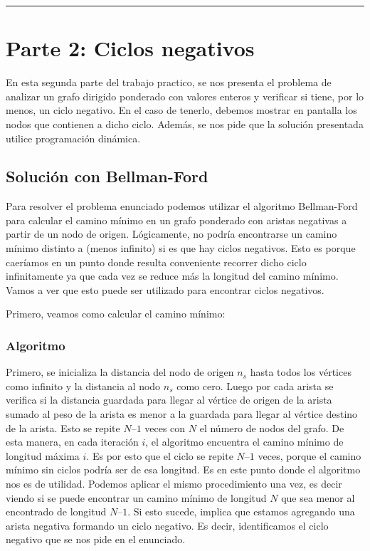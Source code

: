\documentclass[titlepage,a4paper]{article}
\begin{document}
\noindent\rule{\textwidth}{0.5pt}

\newpage

\section{Parte 2: Ciclos negativos}
\label{sec:org1a03caa}

En esta segunda parte del trabajo practico, se nos presenta el problema de
analizar un grafo dirigido ponderado con valores enteros y verificar si tiene,
por lo menos, un ciclo negativo. En el caso de tenerlo, debemos mostrar en
pantalla los nodos que contienen a dicho ciclo. Además, se nos pide que la
solución presentada utilice programación dinámica.

\subsection{Solución con Bellman-Ford}
\label{sec:org5f72b3a}
Para resolver el problema enunciado podemos utilizar el algoritmo Bellman-Ford
para calcular el camino mínimo en un grafo ponderado con aristas negativas a
partir de un nodo de origen. Lógicamente, no podría encontrarse un camino mínimo
distinto a (menos infinito) si es que hay ciclos negativos. Esto es porque
caeríamos en un punto donde resulta conveniente recorrer dicho ciclo
infinitamente ya que cada vez se reduce más la longitud del camino mínimo. Vamos
a ver que esto puede ser utilizado para encontrar ciclos negativos.


\hfill

Primero, veamos como calcular el camino mínimo:

\subsubsection{Algoritmo}
\label{sec:org2ca4ac7}

Primero, se inicializa la distancia del nodo de origen \(n_s\) hasta todos los
vértices como infinito y la distancia al nodo \(n_s\) como cero. Luego por cada
arista se verifica si la distancia guardada para llegar al vértice de origen de
la arista sumado al peso de la arista es menor a la guardada para llegar al
vértice destino de la arista. Esto se repite \(N – 1\) veces con \(N\) el número de
nodos del grafo. De esta manera, en cada iteración \(i\), el algoritmo encuentra el
camino mínimo de longitud máxima \(i\). Es por esto que el ciclo se repite \(N – 1\)
veces, porque el camino mínimo sin ciclos podría ser de esa longitud. Es en este
punto donde el algoritmo nos es de utilidad. Podemos aplicar el mismo
procedimiento una vez, es decir viendo si se puede encontrar un camino mínimo de
longitud \(N\) que sea menor al encontrado de longitud \(N – 1\). Si esto sucede,
implica que estamos agregando una arista negativa formando un ciclo negativo. Es
decir, identificamos el ciclo negativo que se nos pide en el enunciado.
\end{document}
